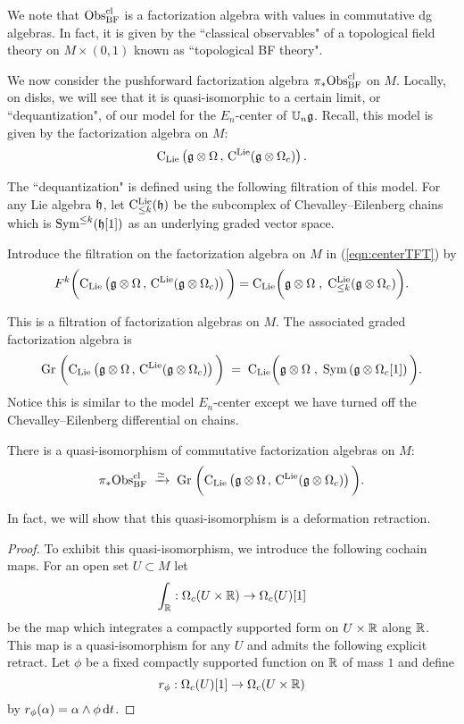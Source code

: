 \documentclass[11pt]{amsart}
\numberwithin{equation}{section}
\begin{document}
We note that ${\rm Obs}_{\rm BF}^{\rm cl}$ is a factorization algebra with values in commutative dg algebras. 
In fact, it is given by the ``classical observables" of a topological field theory on $M \times (0,1)$ known as ``topological BF theory". 

We now consider the pushforward factorization algebra $\pi_* {\rm Obs}^{\rm cl}_{\rm BF}$ on $M$.
Locally, on disks, we will see that it is quasi-isomorphic to a certain limit, or ``dequantization", of our model for the $E_n$-center of $\mathbb U_n \mathfrak g$.
Recall, this model is given by the factorization algebra on $M$:
\begin{equation}\label{eqn:centerTFT}
{\rm C}_{{\rm Lie}}\left(\mathfrak g \otimes \Omega \, , \, {\rm C}^{\rm Lie} (\mathfrak g \otimes \Omega_c) \right) .
\end{equation}

The ``dequantization" is defined using the following filtration of this model.
For any Lie algebra $\mathfrak h$, let ${\rm C}^{\rm Lie}_{\leq k} (\mathfrak h)$ be the subcomplex of Chevalley--Eilenberg chains which is ${\rm Sym}^{\leq k} (\mathfrak h[1])$ as an underlying graded vector space. 

\begin{dfn}
Introduce the filtration on the factorization algebra on $M$ in (\ref{eqn:centerTFT}) by 
\[
F^k \bigg({\rm C}_{{\rm Lie}}\left(\mathfrak g \otimes \Omega \, , \, {\rm C}^{\rm Lie} (\mathfrak g \otimes \Omega_c) \right) \bigg) = {\rm C}_{{\rm Lie}} \bigg(\mathfrak g \otimes \Omega \; , \; {\rm C}^{\rm Lie}_{\leq k} (\mathfrak g \otimes \Omega_c) \bigg) .
\]
\end{dfn}

This is a filtration of factorization algebras on $M$. 
The associated graded factorization algebra is
\[
{\rm Gr} \; \bigg({\rm C}_{{\rm Lie}}\left(\mathfrak g \otimes \Omega \, , \, {\rm C}^{\rm Lie} (\mathfrak g \otimes \Omega_c) \right) \bigg) \; = \; {\rm C}_{{\rm Lie}} \bigg(\mathfrak g \otimes \Omega \; , \; {\rm Sym} \left(\mathfrak g \otimes \Omega_c [1] \right) \bigg) .
\]
Notice this is similar to the model $E_n$-center except we have turned off the Chevalley--Eilenberg differential on chains. 

 \begin{lmm}
There is a quasi-isomorphism of commutative factorization algebras on $M$:
\[
\pi_* {\rm Obs}^{\rm cl}_{\rm BF} \; \xrightarrow{\simeq} \; {\rm Gr} \; \bigg({\rm C}_{{\rm Lie}}\left(\mathfrak g \otimes \Omega \, , \, {\rm C}^{\rm Lie} (\mathfrak g \otimes \Omega_c) \right) \bigg) .
\]
\end{lmm}

In fact, we will show that this quasi-isomorphism is a deformation retraction. 

\begin{proof}
To exhibit this quasi-isomorphism, we introduce the following cochain maps.
For an open set $U \subset M$ let
\[
\int_\mathbb R : \Omega_c(U \times \mathbb R) \to \Omega_c (U) [1] 
\] 
be the map which integrates a compactly supported form on $U \times \mathbb R$ along $\mathbb R$. 
This map is a quasi-isomorphism for any $U $ and admits the following explicit retract. 
Let $\phi$ be a fixed compactly supported function on $\mathbb R$ of mass $1$ and define
\[
r_\phi : \Omega_c(U) [1] \to \Omega_c (U \times \mathbb R)
\]
by $r_\phi (\alpha) = \alpha \wedge \phi \, {\rm d} t$. 
\end{proof}
\end{document}
